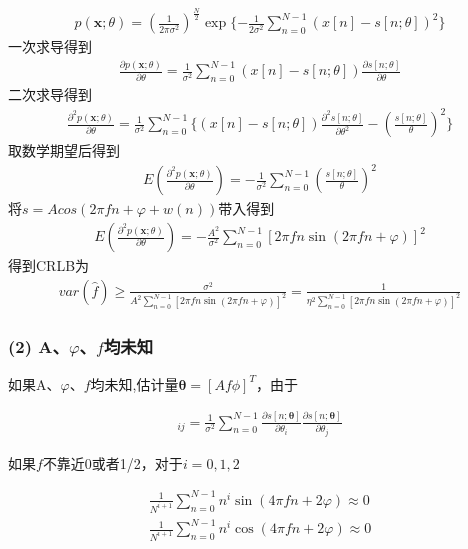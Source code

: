 \documentclass[fontset=windows]{article}
\numberwithin{figure}{section}
\begin{document}
\begin{align*}
	p(\mathbf{x};\theta)=(\frac{1}{2\pi \sigma^2})^{\frac{N}{2}}
	\exp\{ -\frac{1}{2\sigma^2}\sum_{n=0}^{N-1}(x[n]-s[n;\theta])^2 \}
\end{align*}
一次求导得到
\begin{align*}
	\frac{\partial p(\mathbf{x};\theta)}{\partial \theta}=
	\frac{1}{\sigma^2}\sum_{n=0}^{N-1}(x[n]-s[n;\theta])\frac{\partial s[n;\theta]}{\partial\theta}
\end{align*}
二次求导得到
\begin{align*}
	\frac{\partial^2 p(\mathbf{x};\theta)}{\partial \theta}=
	\frac{1}{\sigma^2}\sum_{n=0}^{N-1}\{(x[n]-s[n;\theta])
	\frac{\partial^2 s[n;\theta]}{\partial\theta^2}
	-\left(\frac{s[n;\theta]}{\theta}\right)^2\}
\end{align*}
取数学期望后得到
\begin{align*}
	E\left(\frac{\partial^2 p(\mathbf{x};\theta)}{\partial \theta}\right)=
	-\frac{1}{\sigma^2}\sum_{n=0}^{N-1}
	\left(\frac{s[n;\theta]}{\theta}\right)^2
\end{align*}
将\(s=Acos(2\pi f n +\varphi + w(n))\)带入得到
\begin{align*}
	E\left(\frac{\partial^2 p(\mathbf{x};\theta)}{\partial \theta}\right)=
	-\frac{A^2}{\sigma^2}\sum_{n=0}^{N-1}
	\left[2\pi f n \sin(2\pi f n+\varphi)\right]^2
\end{align*}
得到CRLB为
\begin{align*}
	var(\hat{f})
	\geq \frac{\sigma^2}{A^2 \sum_{n=0}^{N-1}
		\left[2\pi f n \sin(2\pi f n+\varphi)\right]^2}
	=	\frac{1}{\eta ^2 \sum_{n=0}^{N-1}
		\left[2\pi f n \sin(2\pi f n+\varphi)\right]^2}
\end{align*}

\subsubsection*{(2) A、\(\varphi\)、\(f\)均未知}
如果A、\(\varphi\)、\(f\)均未知,估计量\(\boldsymbol{\theta}=[Af\phi]^T\)，由于

\begin{align*}
	[\mathbf{I}(\boldsymbol{\theta})]_{ij}=\frac{1}{\sigma^2}\sum_{n=0}^{N-1}
	\frac{\partial s[n;\boldsymbol{\theta}]}{\partial \theta_i}
	\frac{\partial s[n;\boldsymbol{\theta}]}{\partial \theta_j}
\end{align*}

如果\(f\)不靠近0或者1/2，对于\(i=0,1,2\)

\begin{align*}
	\frac{1}{N^{i+1}}\sum_{n=0}^{N-1}n^i\sin(4\pi f n+2\varphi)\approx 0 \\
	\frac{1}{N^{i+1}}\sum_{n=0}^{N-1}n^i\cos(4\pi f n+2\varphi)\approx 0
\end{align*}
\end{document}
